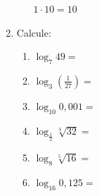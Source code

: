 \documentclass[a4paper, 12pt]{article}
\begin{document}
\begin{enumerate}
\begin{enumerate}
    $ 1 \cdot 10 = 10 $ 
  \end{enumerate}
\item Calcule:
  \begin{enumerate}
  \item $ \log_7 49 = $
  \item $ \log_3 \left ( \frac{1}{27} \right ) = $
  \item $ \log_{10} 0,001 = $
  \item $ \log_{\frac{1}{2}} \sqrt[3]{32} = $
  \item $ \log_8 \sqrt[5]{16} = $
  \item $ \log_{16} 0,125 = $
  \end{enumerate}
\end{enumerate}
\end{document}
